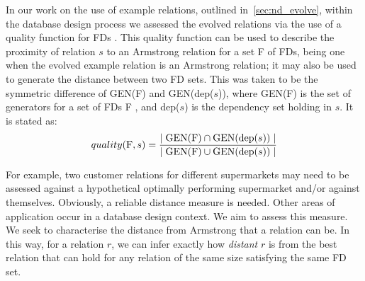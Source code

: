\smallskip
In our
work on the use of example relations, outlined
 in~\ref{sec:nd_evolve}, within the database 
design process we assessed the evolved relations via the use
of a quality function for FDs \cite{cl96}. This quality function can
be used to describe the proximity of relation $s$ to an Armstrong relation for a set F of FDs, being one when the evolved 
example relation is an Armstrong relation; it may also be used to
generate the distance between two FD sets. This was taken to be the
 symmetric difference of GEN(F) and GEN(dep($s$)), where
GEN(F) is the set of generators for a set of FDs F \cite{mr86}, and
dep($s$) is the dependency set holding in $s$. It is stated as:
\begin{equation}\label{eq:quality}
quality({\rm F}, s) = \frac{\mid {\rm GEN(F)} \cap {\rm GEN}({\rm dep}(s))
\mid}{\mid {\rm GEN}({\rm F}) \cup {\rm GEN}({\rm dep}(s))\mid }
\end{equation}

For example, two customer
relations for different supermarkets may need to be assessed
against a hypothetical optimally performing supermarket and/or
against themselves. Obviously, a reliable distance measure
is needed. Other areas of application occur in a database design
context. We aim to assess this measure. We seek to characterise the distance 
from Armstrong that a relation
can be. In this way, for a relation $r$, we can infer exactly how
{\em distant} $r$ is from the best relation that can hold for any
relation of the same size satisfying the same FD set.\\


\smallskip

